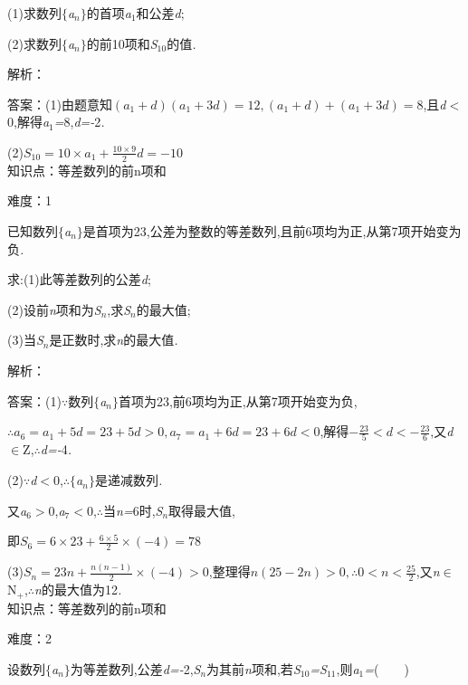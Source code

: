 \documentclass{article} %
\begin{document}
 (1)求数列$\mathrm{\{}$\textit{a${}_{n}$}$\mathrm{\}}$的首项\textit{a}${}_{1}$和公差\textit{d};

 (2)求数列$\mathrm{\{}$\textit{a${}_{n}$}$\mathrm{\}}$的前10项和\textit{S}${}_{10}$的值\textit{.}

解析：

 答案：(1)由题意知$(a_1+d)(a_1+3d)=12,(a_1+d)+(a_1+3d)=8$,且\textit{d$<$}0,解得\textit{a}${}_{1}$\textit{=}8,\textit{d=-}2\textit{.}

(2)$S_{10}=10\times a_1+\frac{10\times 9}{2}d=-10$ \\

知识点：等差数列的前n项和

难度：1

 已知数列$\mathrm{\{}$\textit{a${}_{n}$}$\mathrm{\}}$是首项为23,公差为整数的等差数列,且前6项均为正,从第7项开始变为负\textit{.}

 求:(1)此等差数列的公差\textit{d};

 (2)设前\textit{n}项和为\textit{S${}_{n}$},求\textit{S${}_{n}$}的最大值;

 (3)当\textit{S${}_{n}$}是正数时,求\textit{n}的最大值\textit{.}

解析：

 答案：(1)\textit{$\because$}数列$\mathrm{\{}$\textit{a${}_{n}$}$\mathrm{\}}$首项为23,前6项均为正,从第7项开始变为负,

$\therefore a_6=a_1+5d=23+5d>0,a_7=a_1+6d=23+6d<0$,解得$-\frac{23}{5}<d<-\frac{23}{6}$,又\textit{d}$\mathrm{\in}$Z,\textit{$\therefore$d=-}4\textit{.}

(2)\textit{$\because$d$<$}0,\textit{$\therefore$}$\mathrm{\{}$\textit{a${}_{n}$}$\mathrm{\}}$是递减数列\textit{.}

又\textit{a}${}_{6}$\textit{$>$}0,\textit{a}${}_{7}$\textit{$<$}0,\textit{$\therefore$}当\textit{n=}6时,\textit{S${}_{n}$}取得最大值,

即$S_6=6\times 23+\frac{6\times 5}{2}\times (-4)=78$

(3)$S_n=23n+\frac{n(n-1)}{2}\times (-4)>0$,整理得$n(25-2n)>0,\therefore0<n<\frac{25}{2}$,又\textit{n}$\mathrm{\in}$N\textit{${}_{+}$},\textit{$\therefore$n}的最大值为12\textit{.} \\

知识点：等差数列的前n项和

难度：2

 设数列$\mathrm{\{}$\textit{a${}_{n}$}$\mathrm{\}}$为等差数列,公差\textit{d=-}2,\textit{S${}_{n}$}为其前\textit{n}项和,若\textit{S}${}_{10}$\textit{=S}${}_{11}$,则\textit{a}${}_{1}$\textit{=}(\textit{　　})
\end{document}
